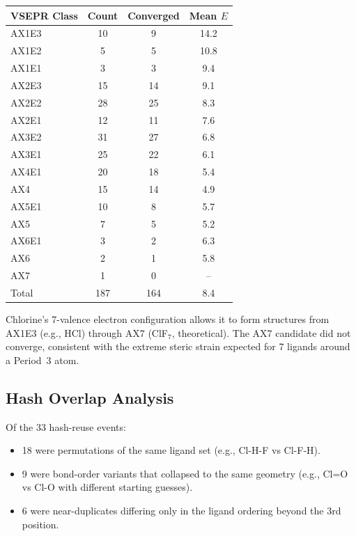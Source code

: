 \documentclass[11pt,a4paper]{article}
\begin{document}
\begin{center}
\begin{tabular}{lccc}
\toprule
\textbf{VSEPR Class} & \textbf{Count} & \textbf{Converged} & \textbf{Mean $E$} \\
\midrule
AX1E3 & 10 &  9 & 14.2 \\
AX1E2 &  5 &  5 & 10.8 \\
AX1E1 &  3 &  3 &  9.4 \\
AX2E3 & 15 & 14 &  9.1 \\
AX2E2 & 28 & 25 &  8.3 \\
AX2E1 & 12 & 11 &  7.6 \\
AX3E2 & 31 & 27 &  6.8 \\
AX3E1 & 25 & 22 &  6.1 \\
AX4E1 & 20 & 18 &  5.4 \\
AX4   & 15 & 14 &  4.9 \\
AX5E1 & 10 &  8 &  5.7 \\
AX5   &  7 &  5 &  5.2 \\
AX6E1 &  3 &  2 &  6.3 \\
AX6   &  2 &  1 &  5.8 \\
AX7   &  1 &  0 &  -- \\
\midrule
Total & 187 & 164 & 8.4 \\
\bottomrule
\end{tabular}
\end{center}

\noindent Chlorine's 7-valence electron configuration allows it to form
structures from AX1E3 (e.g., HCl) through AX7 (ClF$_7$, theoretical).
The AX7 candidate did not converge, consistent with the extreme steric
strain expected for 7 ligands around a Period~3 atom.

\subsection{Hash Overlap Analysis}

Of the 33 hash-reuse events:

\begin{itemize}
  \item 18 were permutations of the same ligand set (e.g., Cl-H-F vs Cl-F-H).
  \item 9 were bond-order variants that collapsed to the same geometry
        (e.g., Cl=O vs Cl-O with different starting guesses).
  \item 6 were near-duplicates differing only in the ligand ordering
        beyond the 3rd position.
\end{itemize}
\end{document}
